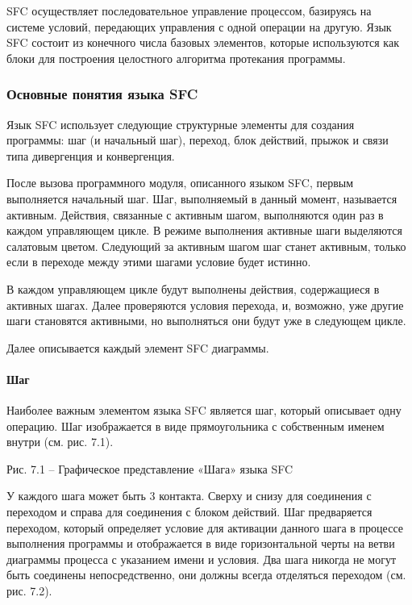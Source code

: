 \documentclass[letterpaper,10pt,russian]{sphinxmanual}
\begin{document}
SFC осуществляет последовательное управление процессом, базируясь на
системе условий, передающих управления с одной операции на другую. Язык
SFC состоит из конечного числа базовых элементов, которые используются
как блоки для построения целостного алгоритма протекания программы.


\subsubsection{Основные понятия языка SFC}
\label{iec_guide/sfc_guide:id2}
Язык SFC использует следующие структурные элементы для создания
программы: шаг (и начальный шаг), переход, блок действий, прыжок и связи
типа дивергенция и конвергенция.

После вызова программного модуля, описанного языком SFC, первым
выполняется начальный шаг. Шаг, выполняемый в данный момент, называется
активным. Действия, связанные с активным шагом, выполняются один раз в
каждом управляющем цикле. В режиме выполнения активные шаги выделяются
салатовым цветом. Следующий за активным шагом шаг станет активным,
только если в переходе между этими шагами условие будет истинно.

В каждом управляющем цикле будут выполнены действия, содержащиеся в
активных шагах. Далее проверяются условия перехода, и, возможно, уже
другие шаги становятся активными, но выполняться они будут уже в
следующем цикле.

Далее описывается каждый элемент SFC диаграммы.


\paragraph{Шаг}
\label{iec_guide/sfc_guide:id3}
Наиболее важным элементом языка SFC является шаг, который описывает одну
операцию. Шаг изображается в виде прямоугольника с собственным именем
внутри (см. рис. 7.1).


Рис. 7.1 – Графическое представление «Шага» языка SFC

У каждого шага может быть 3 контакта. Сверху и снизу для соединения с
переходом и справа для соединения с блоком действий. Шаг предваряется
переходом, который определяет условие для активации данного шага в
процессе выполнения программы и отображается в виде горизонтальной черты
на ветви диаграммы процесса с указанием имени и условия. Два шага
никогда не могут быть соединены непосредственно, они должны всегда
отделяться переходом (см. рис. 7.2).
\end{document}
